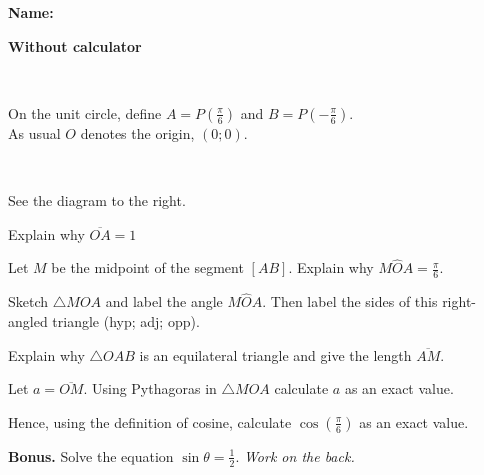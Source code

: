 \documentclass[8pt]{exam}
\begin{document}
\textbf{Name:} \makebox[8cm]{\dotfill}

\vspace{-3mm}

\begin{minipage}{0.55\textwidth}
\textbf{Without calculator}

\

On the unit circle, define $A = P(\frac{\pi}{6})$ and $B = P(-\frac{\pi}{6})$. \\
As usual $O$ denotes the origin, $(0; 0)$.

\

See the diagram to the right.



\end{minipage}
\begin{minipage}{0.35\textwidth}
\vspace{0mm}
\begin{center}
\end{center}
\end{minipage}

\begin{questions}


\question[1] Explain why $\overline{OA} = 1$
\fillwithdottedlines{7mm}

\question[1] Let $M$ be the midpoint of the segment $[AB]$. Explain why $M\hat{O}A = \frac{\pi}{6}$.
\fillwithdottedlines{7mm}

\question[1] Sketch $\triangle MOA$ and label the angle $M\hat{O}A$. Then label the sides of this right-angled triangle (hyp; adj; opp).
\vspace{25mm}

\question[1] Explain why $\triangle OAB$ is an equilateral triangle and give the length $\overline{AM}$.
\fillwithdottedlines{28mm}


\question[1] Let $a = \overline{OM}$. Using Pythagoras in $\triangle MOA$ calculate $a$ as an exact value.
\fillwithdottedlines{21mm}

\question[1] Hence, using the definition of cosine, calculate $\cos(\frac{\pi}{6})$ as an exact value.
\fillwithdottedlines{21mm}

\question[0] \textbf{Bonus.} Solve the equation $\sin \theta = \frac{1}{2}$. \hfill \emph{Work on the back.}



\end{questions}
\vfill 
\end{document}

